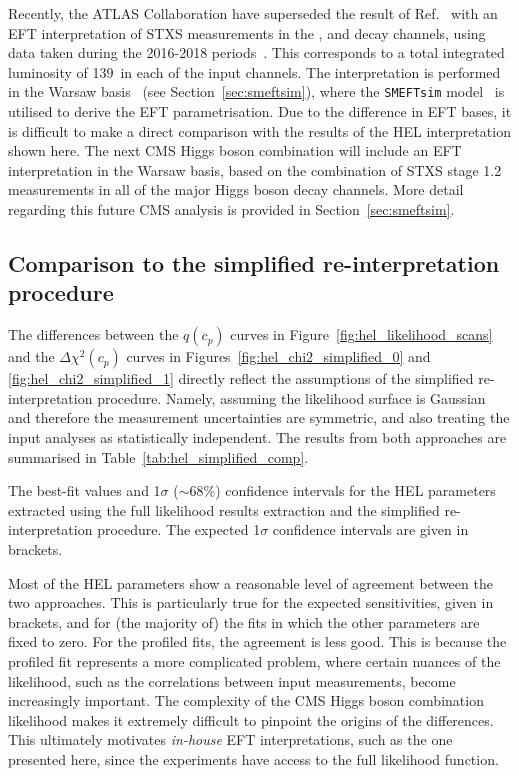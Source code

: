 Recently, the ATLAS Collaboration have superseded the result of Ref.~\cite{ATL-PHYS-PUB-2017-018} with an EFT interpretation of STXS measurements in the \Hbb, \Hgg and \Hfl decay channels, using data taken during the 2016-2018 periods~\cite{ATLAS-CONF-2020-053}. This corresponds to a total integrated luminosity of 139~\fbinv in each of the input channels. The interpretation is performed in the Warsaw basis~\cite{Grzadkowski:2010es} (see Section~\ref{sec:smeftsim}), where the \texttt{SMEFTsim} model~\cite{Brivio:2017btx} is utilised to derive the EFT parametrisation. Due to the difference in EFT bases, it is difficult to make a direct comparison with the results of the HEL interpretation shown here. The next CMS Higgs boson combination will include an EFT interpretation in the Warsaw basis, based on the combination of STXS stage 1.2 measurements in all of the major Higgs boson decay channels. More detail regarding this future CMS analysis is provided in Section~\ref{sec:smeftsim}.

\subsection{Comparison to the simplified re-interpretation procedure}
The differences between the $q(c_p)$ curves in Figure~\ref{fig:hel_likelihood_scans} and the $\Delta\chi^2(c_p)$ curves in Figures~\ref{fig:hel_chi2_simplified_0} and \ref{fig:hel_chi2_simplified_1} directly reflect the assumptions of the simplified re-interpretation procedure. Namely, assuming the likelihood surface is Gaussian and therefore the measurement uncertainties are symmetric, and also treating the input analyses as statistically independent. The results from both approaches are summarised in Table~\ref{tab:hel_simplified_comp}.

\begin{table}
  \centering
  \footnotesize
  \renewcommand{\arraystretch}{1.6}
  \setlength{\tabcolsep}{2pt}
  \caption[Comparison to the HEL parameter constraints from the simplified re-interpretation procedure]
  {
    The best-fit values and 1$\sigma$ ($\sim$68\%) confidence intervals for the HEL parameters extracted using the full likelihood results extraction and the simplified re-interpretation procedure. The expected 1$\sigma$ confidence intervals are given in brackets.
  }
  \label{tab:hel_simplified_comp}
  
\end{table}

Most of the HEL parameters show a reasonable level of agreement between the two approaches. This is particularly true for the expected sensitivities, given in brackets, and for (the majority of) the fits in which the other parameters are fixed to zero. For the profiled fits, the agreement is less good. This is because the profiled fit represents a more complicated problem, where certain nuances of the likelihood, such as the correlations between input measurements, become increasingly important. The complexity of the CMS Higgs boson combination likelihood makes it extremely difficult to pinpoint the origins of the differences. This ultimately motivates \textit{in-house} EFT interpretations, such as the one presented here, since the experiments have access to the full likelihood function.

